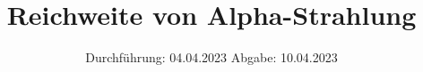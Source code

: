 

\subject{V701}
\title{Reichweite von Alpha-Strahlung}
\date{%
  Durchführung: 04.04.2023
  \hspace{3em}
  Abgabe: 10.04.2023
}



\maketitle
\thispagestyle{empty}
\tableofcontents
\newpage






\printbibliography{}


